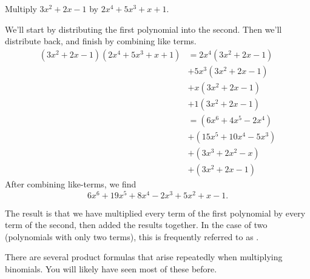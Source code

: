 \documentclass{ximera}
\begin{document}
\begin{example}
	Multiply $3x^2 + 2x - 1$ by $2x^4 + 5x^3+ x + 1$.
	\begin{explanation}
		We'll start by distributing the first polynomial into the second.  Then we'll distribute back, and finish by combining like terms.
		\begin{align*}
			(3x^2+ 2x-1)(2x^4 + 5x^3 + x +1) &= 2x^4(3x^2+ 2x-1) \\
			 &+ 5x^3 (3x^2+ 2x-1) \\
			 &+ x (3x^2+ 2x-1) \\
			 &+ 1(3x^2+ 2x-1)\\
				&= (6x^6 + 4x^5 - 2x^4) \\
				&+ (15x^5 + 10x^4 - 5x^3) \\
				&+ (3x^3+2x^2-x) \\
				&+(3x^2+2x-1)
		\end{align*}
		After combining like-terms, we find \[6x^6 + 19x^5 +8x^4 - 2x^3 + 5x^2+ x - 1.\]
	\end{explanation}
\end{example}
The result is that we have multiplied every term of the first polynomial by every term of the second, then added the results together.  In the case of two
 (polynomials with only two terms), this is frequently referred to as .

There are several product formulas that arise repeatedly when multiplying binomials.  You will likely have seen most of these before.

\noindent{}
\end{document}
